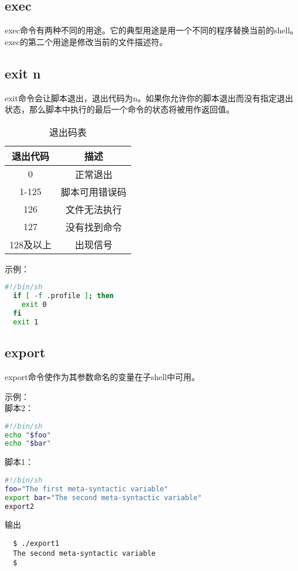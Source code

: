 \documentclass[a4paper]{ctexart}
\begin{document}
\subsection{exec}
exec命令有两种不同的用途。它的典型用途是用一个不同的程序替换当前的shell。
exec的第二个用途是修改当前的文件描述符。

\subsection{exit n}
exit命令会让脚本退出，退出代码为n。如果你允许你的脚本退出而没有指定退出状态，那么脚本中执行的最后一个命令的状态将被用作返回值。
\begin{table}[p!]
  
  \caption{退出码表}
  \centering
  \begin{tabular}{|c|c|}
  \hline
  退出代码 & 描述 \\
  \hline
  0 & 正常退出 \\
  \hline
  1-125 & 脚本可用错误码 \\
  \hline
  126 & 文件无法执行 \\
  \hline
  127 & 没有找到命令 \\
  \hline
  128及以上 & 出现信号\\
  \hline
  \end{tabular}
\end{table}
  
示例：
\begin{lstlisting}[language=sh]
  #!/bin/sh
  if [ -f .profile ]; then
    exit 0
  fi
  exit 1
\end{lstlisting}

\subsection{export}
export命令使作为其参数命名的变量在子shell中可用。

示例：\\
脚本2：
\begin{lstlisting}[language=sh]
#!/bin/sh
echo "$foo"
echo "$bar"
\end{lstlisting}
脚本1：
\begin{lstlisting}[language=sh]
#!/bin/sh
foo="The first meta-syntactic variable"
export bar="The second meta-syntactic variable"
export2
\end{lstlisting}
输出
\begin{lstlisting}
  $ ./export1
  The second meta-syntactic variable
  $
\end{lstlisting}
\end{document}
